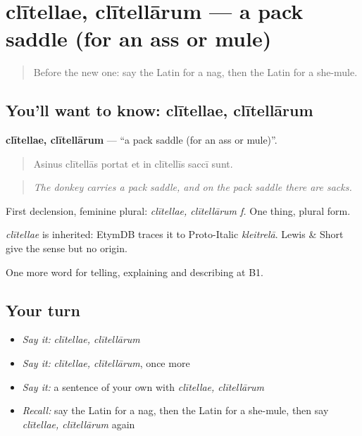 \section[clītellae, clītellārum]{clītellae, clītellārum — a pack saddle (for an ass or mule)}

\label{lesson:LA-C433-clitellae}



\begin{quote}
Before the new one: say the Latin for a nag, then the Latin for a she-mule.
\end{quote}

\subsection*{You'll want to know: clītellae, clītellārum}
\textbf{clītellae, clītellārum} — \textquotedblleft{}a pack saddle (for an ass or mule)\textquotedblright{}.

\begin{quote}
Asinus clītellās portat et in clītellīs saccī sunt.
\end{quote}

\begin{quote}
\emph{The donkey carries a pack saddle, and on the pack saddle there are sacks.}
\end{quote}

First declension, feminine plural: \emph{clītellae, clītellārum f.} One thing, plural form.

\begin{cousinweb}
\emph{clītellae} is inherited: EtymDB traces it to Proto-Italic \emph{kleitrelā}. Lewis \& Short give the sense but no origin.
\end{cousinweb}

\begin{grammarlens}[title={What you've built}]
One more word for telling, explaining and describing at B1.
\end{grammarlens}

\subsection*{Your turn}
\begin{itemize}
\raggedright
  \item \emph{Say it:} \emph{clītellae, clītellārum}
  \item \emph{Say it:} \emph{clītellae, clītellārum}, once more
  \item \emph{Say it:} a sentence of your own with \emph{clītellae, clītellārum}
  \item \emph{Recall:} say the Latin for a nag, then the Latin for a she-mule, then say \emph{clītellae, clītellārum} again
\end{itemize}

